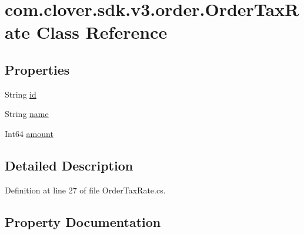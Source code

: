 \hypertarget{classcom_1_1clover_1_1sdk_1_1v3_1_1order_1_1_order_tax_rate}{}\section{com.\+clover.\+sdk.\+v3.\+order.\+Order\+Tax\+Rate Class Reference}
\label{classcom_1_1clover_1_1sdk_1_1v3_1_1order_1_1_order_tax_rate}
\subsection*{Properties}
\begin{DoxyCompactItemize}
\item 
String \hyperlink{classcom_1_1clover_1_1sdk_1_1v3_1_1order_1_1_order_tax_rate_a518f53e255d745e829b1a8da8f4a7422}{id}
\item 
String \hyperlink{classcom_1_1clover_1_1sdk_1_1v3_1_1order_1_1_order_tax_rate_aaf865ec6aabb1f502a32607550540de0}{name}
\item 
Int64 \hyperlink{classcom_1_1clover_1_1sdk_1_1v3_1_1order_1_1_order_tax_rate_adee5633cce953e16f5ba708dad43c956}{amount}
\end{DoxyCompactItemize}


\subsection{Detailed Description}


Definition at line 27 of file Order\+Tax\+Rate.\+cs.



\subsection{Property Documentation}
\mbox{\label{classcom_1_1clover_1_1sdk_1_1v3_1_1order_1_1_order_tax_rate_adee5633cce953e16f5ba708dad43c956}} 
